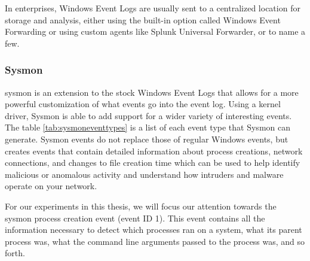 In enterprises, Windows Event Logs are usually sent to a centralized location for storage and analysis, either using the built-in option called Windows Event Forwarding\cite{windows_event_forwarding_docs} or using custom agents like Splunk Universal Forwarder\cite{Splunk_monitor_windows_event_log_data}, \textcite{Winlogbeat} or \textcite{nxlog_collecting_event_log_data} to name a few.

\subsubsection{Sysmon}
\acrfull{sysmon}\cite{Sysmon} is an extension to the stock Windows Event Logs that allows for a more powerful customization of what events go into the event log. Using a kernel driver, Sysmon is able to add support for a wider variety of interesting events. The table \ref{tab:sysmoneventtypes} is a list of each event type that Sysmon can generate.
Sysmon events do not replace those of regular Windows events, but creates events that contain detailed information about process creations, network connections, and changes to file creation time which can be used to help identify malicious or anomalous activity and understand how intruders and malware operate on your network.

For our experiments in this thesis, we will focus our attention towards the \acrshort{sysmon} process creation event (event ID 1). This event contains all the information necessary to detect which processes ran on a system, what its parent process was, what the command line arguments passed to the process was, and so forth.

